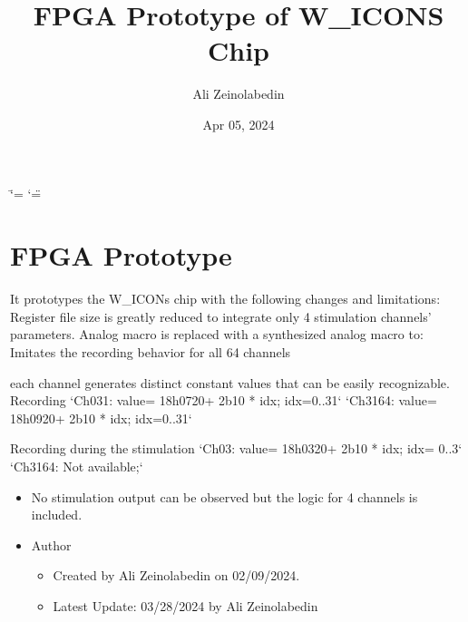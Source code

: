 \documentclass[letterpaper,10pt,english]{sphinxmanual}
\title{FPGA Prototype of W\_ICONS Chip}
\date{Apr 05, 2024}
\author{Ali Zeinolabedin}
\begin{document}
\ifdefined\shorthandoff
  \ifnum\catcode`\=\string=\active\shorthandoff{=}\fi
  \ifnum\catcode`\"=\active{}\fi
\fi

\pagestyle{empty}
\sphinxmaketitle
\pagestyle{plain}
\sphinxtableofcontents
\pagestyle{normal}
\label{\detokenize{index::doc}}


\sphinxstepscope


\chapter{FPGA Prototype}
\label{\detokenize{fpga_prototype:fpga-prototype}}\label{\detokenize{fpga_prototype::doc}}
\sphinxAtStartPar
It prototypes the W\_ICONs chip with the following changes and limitations:
\sphinxhyphen{} Register file size is greatly reduced to integrate only 4 stimulation channels’ parameters.
\sphinxhyphen{} Analog macro is replaced with a synthesized analog macro to:
\sphinxhyphen{} Imitates the recording behavior for all 64 channels

\begin{sphinxVerbatim}[commandchars=\\\{\}]
\PYGZhy{} each channel generates distinct constant values that can be easily recognizable.
  \PYGZhy{} Recording
    \PYGZhy{} `Ch0\PYGZti{}31:    value= 18\PYGZsq{}h0720+ 2\PYGZsq{}b10 * idx; idx=0..31`
    \PYGZhy{} `Ch31\PYGZti{}64:   value= 18\PYGZsq{}h0920+ 2\PYGZsq{}b10 * idx; idx=0..31`

  \PYGZhy{} Recording during the stimulation
    \PYGZhy{} `Ch0\PYGZti{}3:     value= 18\PYGZsq{}h0320+ 2\PYGZsq{}b10 * idx; idx= 0..3`
    \PYGZhy{} `Ch31\PYGZti{}64:   Not available;` 
\end{sphinxVerbatim}
\begin{itemize}
\item {} 
\sphinxAtStartPar
No stimulation output can be observed but the logic for 4 channels is included.

\item {} 
\sphinxAtStartPar
Author
\begin{itemize}
\item {} 
\sphinxAtStartPar
Created by Ali Zeinolabedin on 02/09/2024.

\item {} 
\sphinxAtStartPar
Latest Update: 03/28/2024 by Ali Zeinolabedin

\end{itemize}

\end{itemize}
\end{document}
